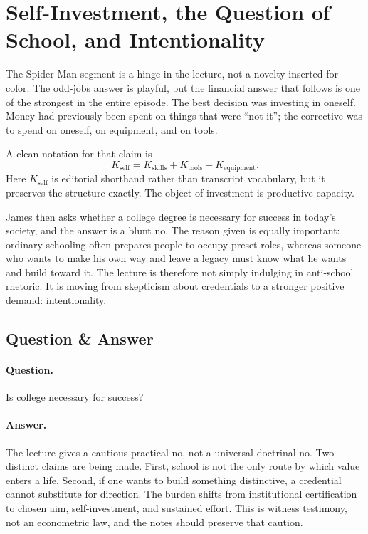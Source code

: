 \section{Self-Investment, the Question of School, and Intentionality}

The Spider-Man segment is a hinge in the lecture, not a novelty inserted for color. The odd-jobs answer is playful, but the financial answer that follows is one of the strongest in the entire episode. The best decision was investing in oneself. Money had previously been spent on things that were ``not it''; the corrective was to spend on oneself, on equipment, and on tools.

A clean notation for that claim is
\begin{equation}
K_{\text{self}} = K_{\text{skills}} + K_{\text{tools}} + K_{\text{equipment}}.
\end{equation}
Here \(K_{\text{self}}\) is editorial shorthand rather than transcript vocabulary, but it preserves the structure exactly. The object of investment is productive capacity.

James then asks whether a college degree is necessary for success in today's society, and the answer is a blunt no. The reason given is equally important: ordinary schooling often prepares people to occupy preset roles, whereas someone who wants to make his own way and leave a legacy must know what he wants and build toward it. The lecture is therefore not simply indulging in anti-school rhetoric. It is moving from skepticism about credentials to a stronger positive demand: intentionality.

\subsection{Question \& Answer}

\paragraph{Question.}
Is college necessary for success?

\paragraph{Answer.}
The lecture gives a cautious practical no, not a universal doctrinal no. Two distinct claims are being made. First, school is not the only route by which value enters a life. Second, if one wants to build something distinctive, a credential cannot substitute for direction. The burden shifts from institutional certification to chosen aim, self-investment, and sustained effort. This is witness testimony, not an econometric law, and the notes should preserve that caution.

